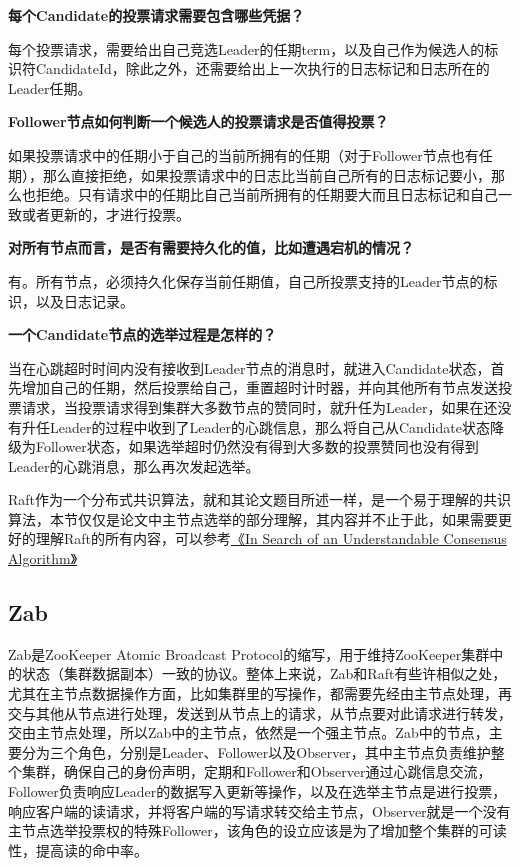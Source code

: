 \documentclass{article}
\begin{document}
\textbf{每个Candidate的投票请求需要包含哪些凭据？}

每个投票请求，需要给出自己竞选Leader的任期term，以及自己作为候选人的标识符CandidateId，除此之外，还需要给出上一次执行的日志标记和日志所在的Leader任期。

\textbf{Follower节点如何判断一个候选人的投票请求是否值得投票？}

如果投票请求中的任期小于自己的当前所拥有的任期（对于Follower节点也有任期），那么直接拒绝，如果投票请求中的日志比当前自己所有的日志标记要小，那么也拒绝。只有请求中的任期比自己当前所拥有的任期要大而且日志标记和自己一致或者更新的，才进行投票。

\textbf{对所有节点而言，是否有需要持久化的值，比如遭遇宕机的情况？}

有。所有节点，必须持久化保存当前任期值，自己所投票支持的Leader节点的标识，以及日志记录。

\textbf{一个Candidate节点的选举过程是怎样的？}

当在心跳超时时间内没有接收到Leader节点的消息时，就进入Candidate状态，首先增加自己的任期，然后投票给自己，重置超时计时器，并向其他所有节点发送投票请求，当投票请求得到集群大多数节点的赞同时，就升任为Leader，如果在还没有升任Leader的过程中收到了Leader的心跳信息，那么将自己从Candidate状态降级为Follower状态，如果选举超时仍然没有得到大多数的投票赞同也没有得到Leader的心跳消息，那么再次发起选举。

Raft作为一个分布式共识算法，就和其论文题目所述一样，是一个易于理解的共识算法，本节仅仅是论文中主节点选举的部分理解，其内容并不止于此，如果需要更好的理解Raft的所有内容，可以参考\href{https://raft.github.io/raft.pdf}{《In Search of an Understandable Consensus Algorithm》}


\subsection{Zab}

Zab是ZooKeeper Atomic Broadcast Protocol的缩写，用于维持ZooKeeper集群中的状态（集群数据副本）一致的协议。整体上来说，Zab和Raft有些许相似之处，尤其在主节点数据操作方面，比如集群里的写操作，都需要先经由主节点处理，再交与其他从节点进行处理，发送到从节点上的请求，从节点要对此请求进行转发，交由主节点处理，所以Zab中的主节点，依然是一个强主节点。Zab中的节点，主要分为三个角色，分别是Leader、Follower以及Observer，其中主节点负责维护整个集群，确保自己的身份声明，定期和Follower和Observer通过心跳信息交流，Follower负责响应Leader的数据写入更新等操作，以及在选举主节点是进行投票，响应客户端的读请求，并将客户端的写请求转交给主节点，Observer就是一个没有主节点选举投票权的特殊Follower，该角色的设立应该是为了增加整个集群的可读性，提高读的命中率。



\end{document}
